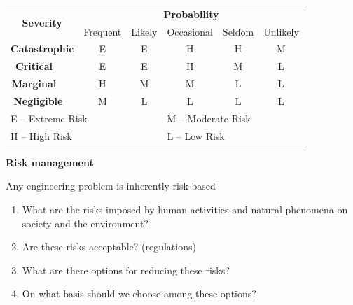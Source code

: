 \documentclass[aspectratio=1610,pdftex,dvipsnames,compress,xcolor={dvipsnames}]{beamer}
\begin{document}
\begin{frame}{}
    \begin{longtable}{|c|c|c|c|c|c|}
        \hline
        \multirow{2}{*}{\textbf{Severity}} 
        & \multicolumn{5}{c|}{\textbf{Probability}} 
        \\ 
        \cline{2-6}
         
        & Frequent 
        & Likely 
        & Occasional 
        & Seldom 
        & Unlikely 
        \\ 
        \hline
        \textbf{Catastrophic} 
        & E 
        & E 
        & H 
        & H 
        & M 
        \\ 
        \hline
        \textbf{Critical}     
        & E 
        & E 
        & H 
        & M 
        & L 
        \\ 
        \hline
        \textbf{Marginal}     
        & H 
        & M 
        & M 
        & L 
        & L 
        \\ 
        \hline
        \textbf{Negligible}   
        & M 
        & L 
        & L 
        & L 
        & L 
        \\ 
        \hline
        \hline
        \multicolumn{3}{|l}{E -- Extreme Risk} 
        & \multicolumn{3}{l|}{M -- Moderate Risk} 
        \\
        \multicolumn{3}{|l}{H -- High Risk}    
        & \multicolumn{3}{l|}{L -- Low Risk} 
        \\ 
        \hline
    \end{longtable}
\end{frame}


\begin{frame}[plain]{}
    \centering\LARGE\textbf{Risk management}
\end{frame}


\addtocounter{framenumber}{-1}
\begin{frame}{Any engineering problem is inherently risk-based}
    \begin{enumerate}[series=outerlist,topsep=0pt,itemsep=21pt,leftmargin=*,label=(\arabic*)]
        \item What are the risks imposed by human activities and natural phenomena on society and the environment?
        \item Are these risks acceptable? (regulations)
        \item What are there options for reducing these risks?
        \item On what basis should we choose among these options?
    \end{enumerate}
\end{frame}
\end{document}
